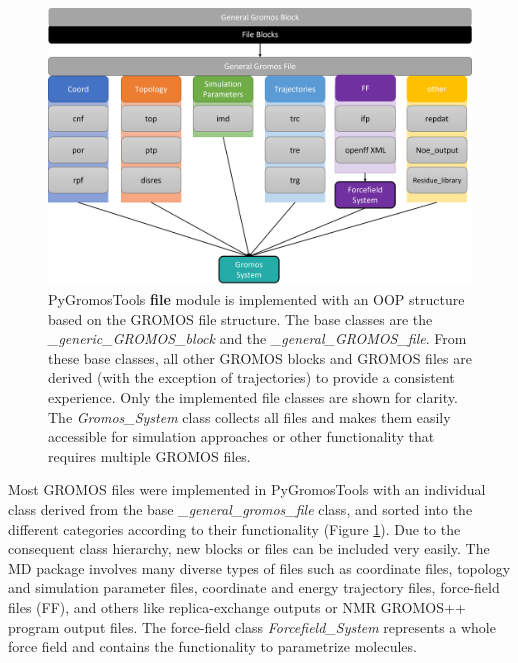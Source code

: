 
\begin{figure}[h]
    \centering
    \includegraphics[width=\textwidth]{fig/implementation/Files.png} 
    \caption{PyGromosTools \textbf{file} module is implemented with an OOP structure based on the GROMOS file structure. The base classes are the \textit{\_generic\_GROMOS\_block} and the \textit{\_general\_GROMOS\_file}. From these base classes, all other GROMOS blocks and GROMOS files are derived (with the exception of trajectories) to provide a consistent experience.
    Only the implemented file classes are shown for clarity. The \textit{Gromos\_System} class collects all files and makes them easily accessible for simulation approaches or other functionality that requires multiple GROMOS files.
    }
    \label{fig: FileModule}
\end{figure}


Most GROMOS files were implemented in PyGromosTools with an individual class derived from the base \textit{\_general\_gromos\_file} class, and sorted into the different categories according to their functionality (Figure \ref{fig: FileModule}). Due to the consequent class hierarchy, new blocks or files can be included very easily. 
The MD package involves many diverse types of files such as coordinate files, topology and simulation parameter files, coordinate and energy trajectory files, force-field files (FF), and others like replica-exchange outputs or NMR GROMOS++ program output files. The force-field class \textit{Forcefield\_System} represents a whole force field and contains the functionality to parametrize molecules.

